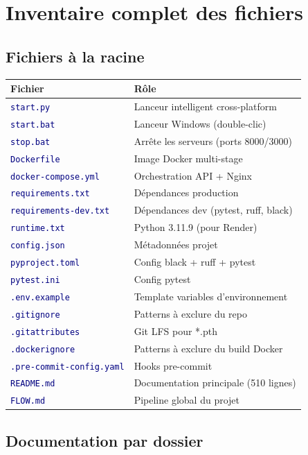 \documentclass[11pt,a4paper,oneside]{report}
\newcommand{\code}[1]{\texttt{\textcolor{navy}{#1}}}
\begin{document}
\section{Inventaire complet des fichiers}

\subsection{Fichiers à la racine}

\begin{table}[!htbp]
\centering
\begin{tabular}{|l|l|}
\hline
\textbf{Fichier} & \textbf{Rôle} \\
\hline
\code{start.py} & Lanceur intelligent cross-platform \\
\code{start.bat} & Lanceur Windows (double-clic) \\
\code{stop.bat} & Arrête les serveurs (ports 8000/3000) \\
\code{Dockerfile} & Image Docker multi-stage \\
\code{docker-compose.yml} & Orchestration API + Nginx \\
\code{requirements.txt} & Dépendances production \\
\code{requirements-dev.txt} & Dépendances dev (pytest, ruff, black) \\
\code{runtime.txt} & Python 3.11.9 (pour Render) \\
\code{config.json} & Métadonnées projet \\
\code{pyproject.toml} & Config black + ruff + pytest \\
\code{pytest.ini} & Config pytest \\
\code{.env.example} & Template variables d'environnement \\
\code{.gitignore} & Patterns à exclure du repo \\
\code{.gitattributes} & Git LFS pour *.pth \\
\code{.dockerignore} & Patterns à exclure du build Docker \\
\code{.pre-commit-config.yaml} & Hooks pre-commit \\
\code{README.md} & Documentation principale (510 lignes) \\
\code{FLOW.md} & Pipeline global du projet \\
\hline
\end{tabular}
\end{table}

\subsection{Documentation par dossier}
\end{document}
